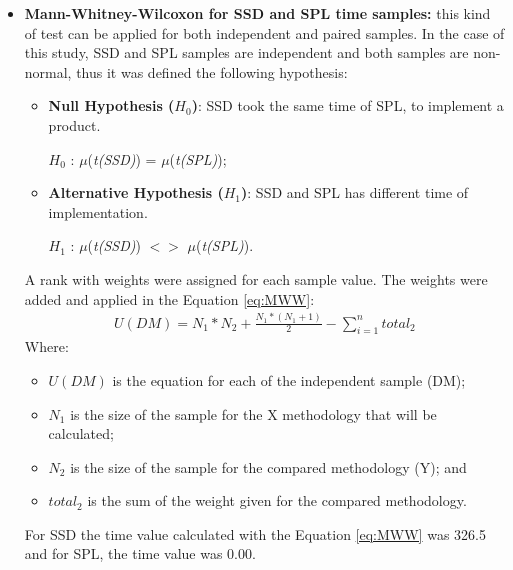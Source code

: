 \begin{itemize}
\item \textbf{Mann-Whitney-Wilcoxon for SSD and SPL time samples:} this kind of test can be applied for both independent and paired samples. In the case of this study, SSD and SPL samples are independent and both samples are non-normal, thus it was defined the following hypothesis:


\begin{itemize}
  \item \textbf{Null Hypothesis ($H_{0}$)}: SSD took the same time of SPL, to implement a product.	
	
	$H_{0}$ : $\mu$(\textit{t(SSD)}) = $\mu$(\textit{t(SPL)}); 
	
	\item \textbf{Alternative  Hypothesis ($H_{1}$)}: SSD and SPL has different time of implementation.	
	
	$H_{1}$ :  $\mu$(\textit{t(SSD)}) $<>$ $\mu$(\textit{t(SPL)}).

	\end{itemize}	

A rank with weights were assigned for each sample value. The weights were added and applied in the Equation \ref{eq:MWW}:
\small
\begin{equation}
\begin{split}
\label{eq:MWW}
U(DM) = N_1 * N_2 + \frac{N_1*(N_1+1)}{2} - \sum_{i=1}^{n} total_{2}
\end{split}
\end{equation}
\normalsize 
Where:
\begin{itemize}
\item \textit{$U(DM)$} is the equation for each of the independent sample (DM);
\item \textit{$N_1$} is the size of the sample for the X methodology that will be calculated;
\item \textit{$N_2$} is the size of the sample for the compared methodology (Y); and
\item \textit{$total_{2}$} is the sum of the weight given for the compared methodology.
\end{itemize}

For SSD the time value calculated with the Equation \ref{eq:MWW} was 326.5 and for SPL, the time value was 0.00.




\end{itemize}
